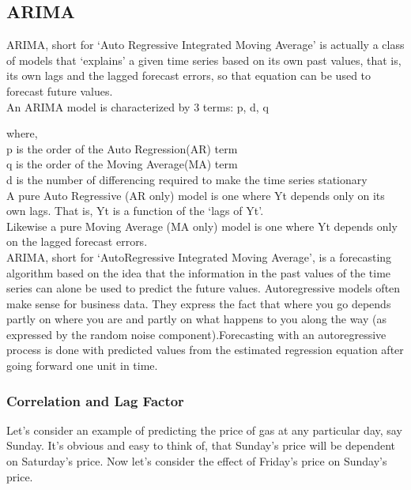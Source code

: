 \documentclass[12pt]{report}
\begin{document}
\subsection{ARIMA}


ARIMA, short for ‘Auto Regressive Integrated Moving Average’ is actually a class of models that ‘explains’ a given time series based on its own past values, that is, its own lags and the lagged forecast errors, so that equation can be used to forecast future values.\\

An ARIMA model is characterized by 3 terms: p, d, q

where,\\

p is the order of the Auto Regression(AR) term\\

q is the order of the Moving Average(MA) term\\

d is the number of differencing required to make the time series stationary\\


A pure Auto Regressive (AR only) model is one where Yt depends only on its own lags. That is, Yt is a function of the ‘lags of Yt’.\\

Likewise a pure Moving Average (MA only) model is one where Yt depends only on the lagged forecast errors.\\

ARIMA, short for ‘AutoRegressive Integrated Moving Average’, is a forecasting algorithm based on the idea that the information in the past values of the time series can alone be used to predict the future values.
Autoregressive models often make sense for business data. They express the fact that where you go depends partly on where you are and partly on what happens to you along the way (as expressed by the random noise component).Forecasting with an autoregressive process is done with predicted values from the estimated regression equation after going forward one unit in time.

\subsubsection{Correlation and Lag Factor}
Let’s consider an example of predicting the price of gas at any particular day, say Sunday. It’s obvious and easy to think of, that Sunday’s price will be dependent on Saturday’s price.
Now let’s consider the effect of Friday’s price on Sunday’s price.
\end{document}
